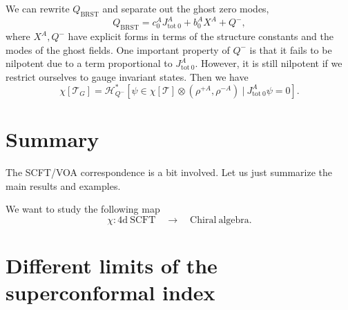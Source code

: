 \documentclass[a4paper,11pt]{article}
\begin{document}
We can rewrite $Q_\mathrm{BRST}$ and separate out the ghost zero modes,
\begin{equation}
    Q_\mathrm{BRST} = c_0^A J^A_{\mathrm{tot}~0} + b_0^A X^A + Q^-,
\end{equation}
where $X^A, Q^-$ have explicit forms in terms of the structure constants and the modes of the ghost fields. One important property of $Q^-$ is that it fails to be nilpotent due to a term proportional to $J^A_{\mathrm{tot}~0}$. However, it is still nilpotent if we restrict ourselves to gauge invariant states. Then we have
\begin{equation}
    \chi[\mathcal{T}_G] = \mathcal{H}^*_{Q^-}[\psi \in \chi[\mathcal{T}] \otimes (\rho^{+A}, \rho^{-A}) \:|\: J^A_{\mathrm{tot}~0} \psi = 0].
\end{equation}


\section{Summary}
The SCFT/VOA correspondence is a bit involved. Let us just summarize the main results and examples.

We want to study the following map
\begin{equation}
    \chi: \mathrm{4d~SCFT} \quad \to \quad \mathrm{Chiral~algebra}.
\end{equation}



\appendix
\section{Different limits of the superconformal index}











\end{document}
